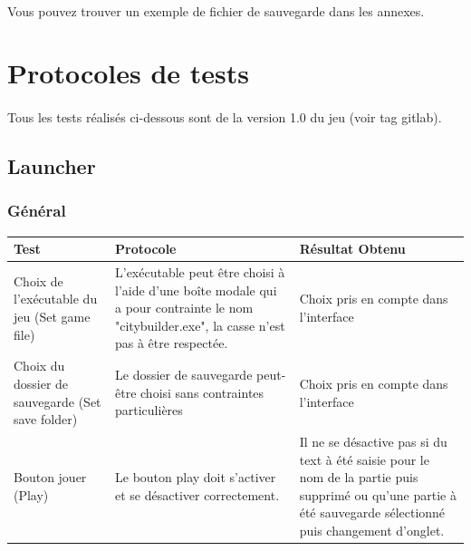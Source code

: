\documentclass[a4paper,10pt,openany,oneside]{report}
\begin{document}
\paragraph{}
Vous pouvez trouver un exemple de fichier de sauvegarde dans les annexes.

\section{Protocoles de tests}
\thispagestyle{headings}
\paragraph{}
Tous les tests réalisés ci-dessous sont de la version 1.0 du jeu (voir tag gitlab).
\subsection{Launcher}

\subsubsection{Général}
\begin{center}
	\begin{tabular}{| p{3cm} | p{6cm} | p{6cm} |}
	\hline
		 \textbf{Test} & \textbf{Protocole} & \textbf{Résultat Obtenu}
		 \\ \hline
		Choix de l'exécutable du jeu (Set game file)&
		L'exécutable peut être choisi à l'aide d'une boîte modale qui a pour contrainte le nom "citybuilder.exe", la casse n'est pas à être respectée. &
		Choix pris en compte dans l'interface
		\\ \hline
		Choix du dossier de sauvegarde (Set save folder) &
		Le dossier de sauvegarde peut-être choisi sans contraintes particulières &
		Choix pris en compte dans l'interface
		\\ \hline
		Bouton jouer (Play) &
		Le bouton play doit s'activer et se désactiver correctement. &
		Il ne se désactive pas si du text à été saisie pour le nom de la partie puis supprimé ou qu'une partie à été sauvegarde sélectionné puis changement d'onglet.
		\\ \hline
	\hline
	\end{tabular}
\end{center}
\end{document}
